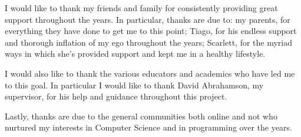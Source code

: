 I would like to thank my friends and family for consistently providing great support throughout the years. In particular, thanks are due to: my parents, for everything they have done to get me to this point; Tiago, for his endless support and thorough inflation of my ego throughout the years; Scarlett, for the myriad ways in which she's provided support and kept me in a healthy lifestyle.

I would also like to thank the various educators and academics who have led me to this goal. In particular I would like to thank David Abrahamson, my supervisor, for his help and guidance throughout this project.

Lastly, thanks are due to the general communities both online and not who nurtured my interests in Computer Science and in programming over the years.
